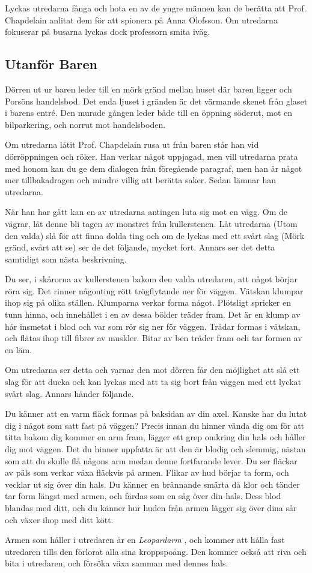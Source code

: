 Lyckas utredarna fånga och hota en av de yngre männen kan de berätta att Prof. Chapdelain anlitat dem för att spionera på Anna Olofsson. Om utredarna fokuserar på busarna lyckas dock professorn smita iväg.
%
\subsection{Utanför Baren}
\label{loc:UtanfarBaren}

\begin{displayquote}
	Dörren ut ur baren leder till en mörk gränd mellan huset där baren ligger och Porsöns handelsbod. Det enda ljuset i gränden är det värmande skenet från glaset i barens entré. Den murade gången leder både till en öppning söderut, mot en bilparkering, och norrut mot handelsboden.
\end{displayquote}
%
Om utredarna låtit Prof. Chapdelain rusa ut från baren står han vid dörröppningen och röker. Han verkar något uppjagad, men vill utredarna prata med honom kan du ge dem dialogen från föregående paragraf, men han är något mer tillbakadragen och mindre villig att berätta saker. Sedan lämnar han utredarna. 

När han har gått kan en av utredarna antingen luta sig mot en vägg. Om de vägrar, låt denne bli tagen av monstret från kullerstenen. Låt utredarna (Utom den valda) slå för att finna dolda ting och om de lyckas med ett svårt slag (Mörk gränd, svårt att se) ser de det följande, mycket fort. Annars ser det detta samtidigt som nästa beskrivning.

\begin{displayquote}
	Du ser, i skårorna av kullerstenen bakom den valda utredaren, att något börjar röra sig. Det rinner någonting rött trögflytande ner för väggen. Vätskan klumpar ihop sig på olika ställen. Klumparna verkar forma något. Plötsligt spricker en tunn hinna, och innehållet i en av dessa bölder träder fram. Det är en klump av hår insmetat i blod och var som rör sig ner för väggen. Trådar formas i vätskan, och flätas ihop till fibrer av muskler. Bitar av ben träder fram och tar formen av en läm.
\end{displayquote}
%
Om utredarna ser detta och varnar den mot dörren får den möjlighet att slå ett slag för att ducka och kan lyckas med att ta sig bort från väggen med ett lyckat svårt slag. Annars händer följande.

\begin{displayquote}
	Du känner att en varm fläck formas på baksidan av din axel. Kanske har du lutat dig i något som satt fast på väggen? Precis innan du hinner vända dig om för att titta bakom dig kommer en arm fram, lägger ett grep omkring din hals och håller dig mot väggen. Det du hinner uppfatta är att den är blodig och slemmig, nästan som att du skulle flå någons arm medan denne fortfarande lever. Du ser fläckar av päls som verkar växa fläckvis på armen. Flikar av hud börjar ta form, och vecklar ut sig över din hals. Du känner en brännande smärta då klor och tänder tar form längst med armen, och färdas som en såg över din hals. Dess blod blandas med ditt, och du känner hur huden från armen lägger sig över dina sår och växer ihop med ditt kött.
\end{displayquote}

Armen som håller i utredaren är en \textit{Leopardarm} \sectiondescribe{\ref{var:Leopardarm}}, och kommer att hålla fast utredaren tills den förlorat alla sina kroppspoäng. Den kommer också att riva och bita i utredaren, och försöka växa samman med dennes hals.